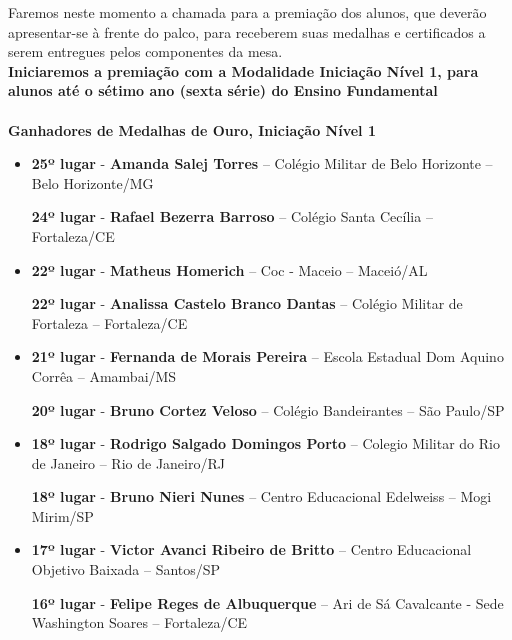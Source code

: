 \documentclass{article}
\begin{document}
\setlength{\parindent}{0pt}

Faremos neste momento a chamada para a premiação dos alunos, que deverão apresentar-se à frente do palco, para receberem suas medalhas e certificados a serem entregues pelos componentes da mesa.\\

\color{blue}
\textbf{Iniciaremos a premiação com a Modalidade Iniciação Nível 1, para alunos até o sétimo ano (sexta série) do Ensino Fundamental}\\\\
\textbf{\color{blue}Ganhadores de Medalhas de Ouro, \color{black}Iniciação Nível 1}
\color{black}

\begin{itemize}
\item
\textbf{25º lugar} - \textbf{Amanda Salej Torres} – Colégio Militar de Belo Horizonte – Belo Horizonte/MG

\textbf{24º lugar} - \textbf{Rafael Bezerra Barroso} – Colégio Santa Cecília – Fortaleza/CE



\item
\textbf{22º lugar} - \textbf{Matheus Homerich} – Coc - Maceio – Maceió/AL


\textbf{22º lugar} - \textbf{Analissa Castelo Branco Dantas} – Colégio Militar de Fortaleza – Fortaleza/CE



\item
\textbf{21º lugar} - \textbf{Fernanda de Morais Pereira} – Escola Estadual Dom Aquino Corrêa – Amambai/MS


\textbf{20º lugar} - \textbf{Bruno Cortez Veloso} – Colégio Bandeirantes – São Paulo/SP



\item
\textbf{18º lugar} - \textbf{Rodrigo Salgado Domingos Porto} – Colegio Militar do Rio de Janeiro – Rio de Janeiro/RJ


\textbf{18º lugar} - \textbf{Bruno Nieri Nunes} – Centro Educacional Edelweiss – Mogi Mirim/SP



\item
\textbf{17º lugar} - \textbf{Victor Avanci Ribeiro de Britto} – Centro Educacional Objetivo Baixada – Santos/SP


\textbf{16º lugar} - \textbf{Felipe Reges de Albuquerque} – Ari de Sá Cavalcante - Sede Washington Soares – Fortaleza/CE




\end{itemize}
\end{document}
